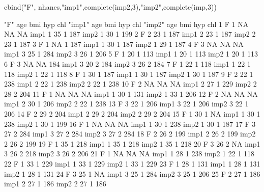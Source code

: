 \begin{Schunk}
\begin{Sinput}
 cbind("F", nhanes,"imp1",complete(imp2,3),"imp2",complete(imp,3))
\end{Sinput}
\begin{Soutput}
   "F" age bmi hyp chl "imp1" age bmi hyp chl "imp2" age bmi hyp chl
1    F   1  NA  NA  NA   imp1   1  35   1 187   imp2   1  30   1 199
2    F   2  23   1 187   imp1   2  23   1 187   imp2   2  23   1 187
3    F   1  NA   1 187   imp1   1  30   1 187   imp2   1  29   1 187
4    F   3  NA  NA  NA   imp1   3  25   1 284   imp2   3  26   1 206
5    F   1  20   1 113   imp1   1  20   1 113   imp2   1  20   1 113
6    F   3  NA  NA 184   imp1   3  20   2 184   imp2   3  26   2 184
7    F   1  22   1 118   imp1   1  22   1 118   imp2   1  22   1 118
8    F   1  30   1 187   imp1   1  30   1 187   imp2   1  30   1 187
9    F   2  22   1 238   imp1   2  22   1 238   imp2   2  22   1 238
10   F   2  NA  NA  NA   imp1   2  27   1 229   imp2   2  28   2 204
11   F   1  NA  NA  NA   imp1   1  30   1 131   imp2   1  33   1 206
12   F   2  NA  NA  NA   imp1   2  30   1 206   imp2   2  22   1 238
13   F   3  22   1 206   imp1   3  22   1 206   imp2   3  22   1 206
14   F   2  29   2 204   imp1   2  29   2 204   imp2   2  29   2 204
15   F   1  30   1  NA   imp1   1  30   1 238   imp2   1  30   1 199
16   F   1  NA  NA  NA   imp1   1  30   1 238   imp2   1  30   1 187
17   F   3  27   2 284   imp1   3  27   2 284   imp2   3  27   2 284
18   F   2  26   2 199   imp1   2  26   2 199   imp2   2  26   2 199
19   F   1  35   1 218   imp1   1  35   1 218   imp2   1  35   1 218
20   F   3  26   2  NA   imp1   3  26   2 218   imp2   3  26   2 206
21   F   1  NA  NA  NA   imp1   1  28   1 238   imp2   1  22   1 118
22   F   1  33   1 229   imp1   1  33   1 229   imp2   1  33   1 229
23   F   1  28   1 131   imp1   1  28   1 131   imp2   1  28   1 131
24   F   3  25   1  NA   imp1   3  25   1 284   imp2   3  25   1 206
25   F   2  27   1 186   imp1   2  27   1 186   imp2   2  27   1 186
\end{Soutput}
\end{Schunk}
